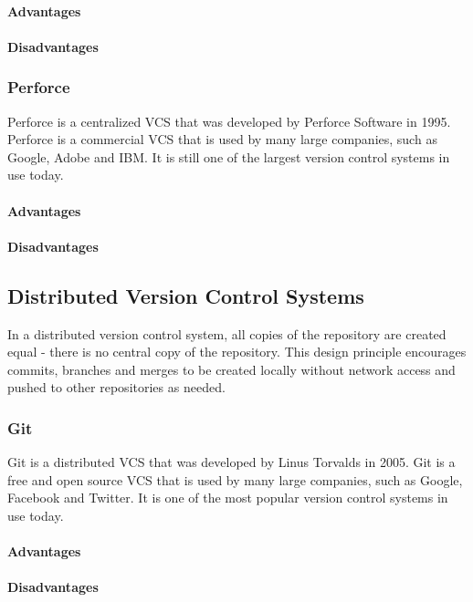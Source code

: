 \paragraph{Advantages}
\paragraph{Disadvantages}
\subsubsection{Perforce}
Perforce is a centralized VCS that was developed by Perforce Software in 1995. Perforce is a commercial VCS that is used by many large companies, such as Google, Adobe and IBM. It is still one of the largest version control systems in use today.
\paragraph{Advantages}
\paragraph{Disadvantages}
\subsection{Distributed Version Control Systems}
In a distributed version control system, all copies of the repository are created equal - there is no central copy of the repository. This design principle encourages commits, branches and merges to be created locally without network access and pushed to other repositories as needed.
\subsubsection{Git}
Git is a distributed VCS that was developed by Linus Torvalds in 2005. Git is a free and open source VCS that is used by many large companies, such as Google, Facebook and Twitter. It is one of the most popular version control systems in use today.
\paragraph{Advantages}
\paragraph{Disadvantages}
